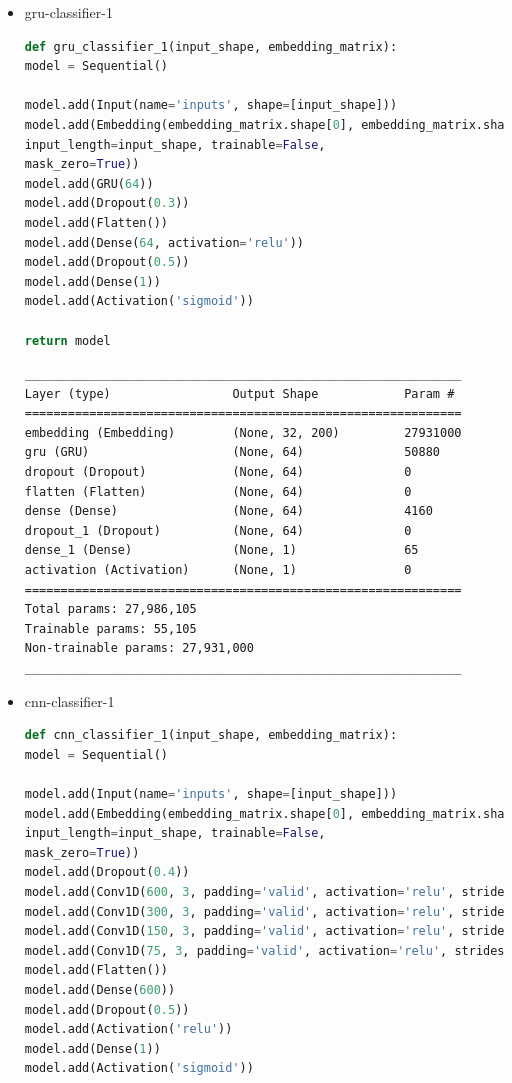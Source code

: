 \documentclass{article}
\begin{document}
\begin{itemize}
\item gru-classifier-1

\begin{lstlisting}[language=Python, caption=Дефиниция на gru-classifier-1.]
def gru_classifier_1(input_shape, embedding_matrix):
model = Sequential()

model.add(Input(name='inputs', shape=[input_shape]))
model.add(Embedding(embedding_matrix.shape[0], embedding_matrix.shape[1], weights=[embedding_matrix],
input_length=input_shape, trainable=False,
mask_zero=True))
model.add(GRU(64))
model.add(Dropout(0.3))
model.add(Flatten())
model.add(Dense(64, activation='relu'))
model.add(Dropout(0.5))
model.add(Dense(1))
model.add(Activation('sigmoid'))

return model
\end{lstlisting}

\begin{lstlisting}[numbers=none, caption=Обобщение на gru-classifier-1.]
_____________________________________________________________
Layer (type)                 Output Shape            Param #
=============================================================
embedding (Embedding)        (None, 32, 200)         27931000
gru (GRU)                    (None, 64)              50880
dropout (Dropout)            (None, 64)              0
flatten (Flatten)            (None, 64)              0
dense (Dense)                (None, 64)              4160
dropout_1 (Dropout)          (None, 64)              0
dense_1 (Dense)              (None, 1)               65
activation (Activation)      (None, 1)               0
=============================================================
Total params: 27,986,105
Trainable params: 55,105
Non-trainable params: 27,931,000
_____________________________________________________________
\end{lstlisting}

\item cnn-classifier-1

\begin{lstlisting}[language=Python, caption=Дефиниция на cnn-classifier-1.]
def cnn_classifier_1(input_shape, embedding_matrix):
model = Sequential()

model.add(Input(name='inputs', shape=[input_shape]))
model.add(Embedding(embedding_matrix.shape[0], embedding_matrix.shape[1], weights=[embedding_matrix],
input_length=input_shape, trainable=False,
mask_zero=True))
model.add(Dropout(0.4))
model.add(Conv1D(600, 3, padding='valid', activation='relu', strides=1))
model.add(Conv1D(300, 3, padding='valid', activation='relu', strides=1))
model.add(Conv1D(150, 3, padding='valid', activation='relu', strides=1))
model.add(Conv1D(75, 3, padding='valid', activation='relu', strides=1))
model.add(Flatten())
model.add(Dense(600))
model.add(Dropout(0.5))
model.add(Activation('relu'))
model.add(Dense(1))
model.add(Activation('sigmoid'))


\end{lstlisting}
\end{itemize}
\end{document}
